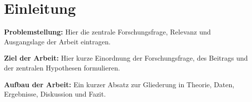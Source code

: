 \documentclass[12pt,ngerman]{scrartcl}
\begin{document}
	
	
	\clearpage
	\clearpage
	
	\section{Einleitung}
	\label{sec:einleitung}
	\noindent
	\textbf{Problemstellung:} Hier die zentrale Forschungsfrage, Relevanz und Ausgangslage der Arbeit eintragen.
	
	\medskip
	\textbf{Ziel der Arbeit:} Hier kurze Einordnung der Forschungsfrage, des Beitrags und der zentralen Hypothesen formulieren.
	
	\medskip
	\textbf{Aufbau der Arbeit:} Ein kurzer Absatz zur Gliederung in Theorie, Daten, Ergebnisse, Diskussion und Fazit.
	
\end{document}
